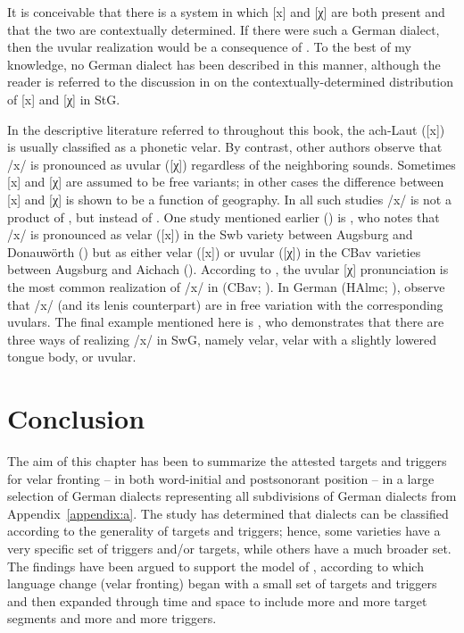 It is conceivable that there is a system in which [x] and [χ] are both present and that the two are contextually determined. If there were such a German dialect, then the uvular realization would be a consequence of . To the best of my knowledge, no German dialect has been described in this manner, although the reader is referred to the discussion in  on the contextually-determined distribution of [x] and [χ] in StG.

In the descriptive literature referred to throughout this book, the ach-Laut ([x]) is usually classified as a phonetic velar. By contrast, other authors observe that /x/ is pronounced as uvular ([χ]) regardless of the neighboring sounds. Sometimes [x] and [χ] are assumed to be free variants; in other cases the difference between [x] and [χ] is shown to be a function of geography.  In all such studies /x/ is not a product of , but instead of . One study mentioned earlier () is \citet{Ibrom1971}, who notes that /x/ is pronounced as velar ([x]) in the Swb variety between Augsburg and Donauwörth () but as either velar ([x]) or uvular ([χ]) in the CBav varieties between Augsburg and Aichach (). According to \citet{Stein-Meintker2000}, the uvular [χ] pronunciation is the most common realization of /x/ in  (CBav; ). In  German (HAlmc; ), \citet[244]{FleischerSchmid2006} observe that /x/ (and its lenis counterpart) are in free variation with the corresponding uvulars. The final example mentioned here is \citet[100-101]{Hove2002}, who demonstrates that there are three ways of realizing /x/ in SwG, namely velar, velar with a slightly lowered tongue body, or uvular.

\section{{Conclusion}}\label{sec:12.10}

The aim of this chapter has been to summarize the attested targets and triggers for velar fronting -- in both word-initial and postsonorant position -- in a large selection of German dialects representing all subdivisions of German dialects from Appendix~\ref{appendix:a}. The study has determined that dialects can be classified according to the generality of targets and triggers; hence, some varieties have a very specific set of triggers and/or targets, while others have a much broader set. The findings have been argued to support the model of , according to which language change (velar fronting) began with a small set of targets and triggers and then expanded through time and space to include more and more target segments and more and more triggers.

